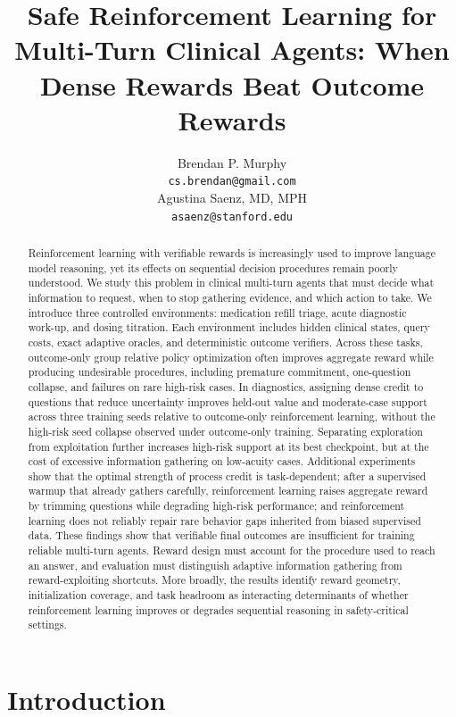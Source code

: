 \documentclass{article}
\title{Safe Reinforcement Learning for Multi-Turn Clinical Agents: When Dense Rewards Beat Outcome Rewards}
\author{
  Brendan P. Murphy \\
  \texttt{cs.brendan@gmail.com} \\
  \And
  Agustina Saenz, MD, MPH \\
  \texttt{asaenz@stanford.edu} \\
}
\begin{document}
\maketitle
\thispagestyle{plain}

\begin{abstract}
Reinforcement learning with verifiable rewards is increasingly used to improve language model reasoning, yet its effects on sequential decision procedures remain poorly understood. We study this problem in clinical multi-turn agents that must decide what information to request, when to stop gathering evidence, and which action to take. We introduce three controlled environments: medication refill triage, acute diagnostic work-up, and dosing titration. Each environment includes hidden clinical states, query costs, exact adaptive oracles, and deterministic outcome verifiers. Across these tasks, outcome-only group relative policy optimization often improves aggregate reward while producing undesirable procedures, including premature commitment, one-question collapse, and failures on rare high-risk cases. In diagnostics, assigning dense credit to questions that reduce uncertainty improves held-out value and moderate-case support across three training seeds relative to outcome-only reinforcement learning, without the high-risk seed collapse observed under outcome-only training. Separating exploration from exploitation further increases high-risk support at its best checkpoint, but at the cost of excessive information gathering on low-acuity cases. Additional experiments show that the optimal strength of process credit is task-dependent; after a supervised warmup that already gathers carefully, reinforcement learning raises aggregate reward by trimming questions while degrading high-risk performance; and reinforcement learning does not reliably repair rare behavior gaps inherited from biased supervised data. These findings show that verifiable final outcomes are insufficient for training reliable multi-turn agents. Reward design must account for the procedure used to reach an answer, and evaluation must distinguish adaptive information gathering from reward-exploiting shortcuts. More broadly, the results identify reward geometry, initialization coverage, and task headroom as interacting determinants of whether reinforcement learning improves or degrades sequential reasoning in safety-critical settings.

\end{abstract}


\section{Introduction}
\label{sec:intro}
\end{document}
